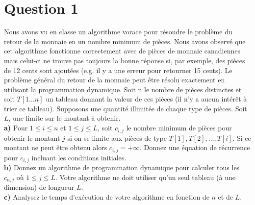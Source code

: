 \documentclass[devoir3.tex]{subfiles}
\begin{document}
\section*{Question 1}
Nous avons vu en classe un algorithme vorace pour résoudre le problème du retour de la monnaie en un nombre minimum de pièces. Nous avons observé que cet algorithme fonctionne correctement avec de pièces de monnaie canadiennes mais celui-ci ne trouve pas toujours la bonne réponse si, par exemple, des pièces de 12 cents sont ajoutées (e.g. il y a une erreur pour retourner 15 cents). Le problème général du retour de la monnaie peut être résolu exactement en utilisant la programmation dynamique.
Soit n le nombre de pièces distinctes et soit \(T[1 \dots n]\) un tableau donnant la valeur de ces pièces (il n’y a aucun intérêt à trier ce tableau). Supposons une quantité illimitée de chaque type de pièces. Soit \(L\), une limite sur le montant à obtenir. \\

\textbf{a)} Pour \(1 \leq i \leq n\) et \(1 \leq j \leq L\), soit \(c_{i,j}\) le nombre minimum
de pièces pour obtenir le montant \(j\) si on se limite aux pièces de type \(T[1], T[2], \dots , T[i]\). Si ce montant ne peut être obtenu alors \(c_{i,j} = +\infty \). Donnez une équation de récurrence pour \(c_{i,j}\) incluant les conditions initiales. \\

\textbf{b)} Donnez un algorithme de programmation dynamique pour calculer tous les \(c_{n,j}\) où \(1 \leq j \leq L\). Votre algorithme ne doit utiliser qu’un seul tableau (à une dimension) de longueur \(L\). \\

\textbf{c)} Analysez le temps d’exécution de votre algorithme en fonction de \(n\)
et de \(L\).
\end{document}
